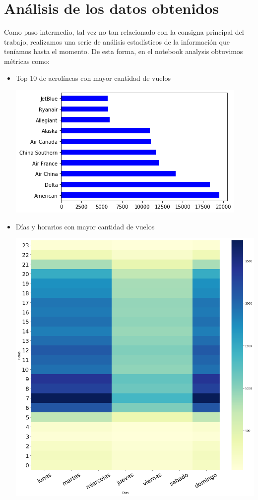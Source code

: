 \documentclass[a4paper,11pt]{article}
\begin{document}
\section{Análisis de los datos obtenidos}
Como paso intermedio, tal vez no tan relacionado con la consigna principal del trabajo, realizamos una serie de análisis estadísticos de la información que teníamos hasta el momento.
De esta forma, en el notebook analysis obtuvimos métricas como:
\begin{itemize}
\item Top 10 de aerolíneas con mayor cantidad de vuelos
\begin{center}
\includegraphics[scale=0.60]{./imagenes/aerolineas_top10.png}
\end{center}
\newpage
\item Días y horarios con mayor cantidad de vuelos
\begin{center}
\includegraphics[scale=0.25]{./imagenes/heatmap.png}

\end{center}
\end{itemize}
\end{document}
